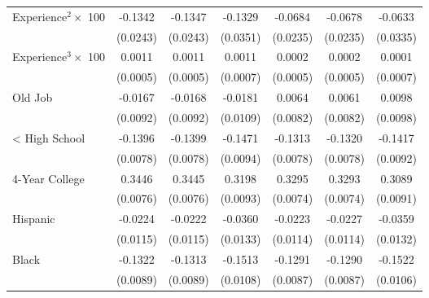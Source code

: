 {\begin{longtable}{l*{6}{c}}
Experience$^2\times$ 100&     -0.1342\sym{***}&     -0.1347\sym{***}&     -0.1329\sym{***}&     -0.0684\sym{***}&     -0.0678\sym{***}&     -0.0633\sym{*}  \\
                    &    (0.0243)         &    (0.0243)         &    (0.0351)         &    (0.0235)         &    (0.0235)         &    (0.0335)         \\
Experience$^3\times$ 100&      0.0011\sym{**} &      0.0011\sym{**} &      0.0011         &      0.0002         &      0.0002         &      0.0001         \\
                    &    (0.0005)         &    (0.0005)         &    (0.0007)         &    (0.0005)         &    (0.0005)         &    (0.0007)         \\
Old Job             &     -0.0167\sym{*}  &     -0.0168\sym{*}  &     -0.0181\sym{*}  &      0.0064         &      0.0061         &      0.0098         \\
                    &    (0.0092)         &    (0.0092)         &    (0.0109)         &    (0.0082)         &    (0.0082)         &    (0.0098)         \\
< High School       &     -0.1396\sym{***}&     -0.1399\sym{***}&     -0.1471\sym{***}&     -0.1313\sym{***}&     -0.1320\sym{***}&     -0.1417\sym{***}\\
                    &    (0.0078)         &    (0.0078)         &    (0.0094)         &    (0.0078)         &    (0.0078)         &    (0.0092)         \\
4-Year College      &      0.3446\sym{***}&      0.3445\sym{***}&      0.3198\sym{***}&      0.3295\sym{***}&      0.3293\sym{***}&      0.3089\sym{***}\\
                    &    (0.0076)         &    (0.0076)         &    (0.0093)         &    (0.0074)         &    (0.0074)         &    (0.0091)         \\
Hispanic            &     -0.0224\sym{*}  &     -0.0222\sym{*}  &     -0.0360\sym{***}&     -0.0223\sym{**} &     -0.0227\sym{**} &     -0.0359\sym{***}\\
                    &    (0.0115)         &    (0.0115)         &    (0.0133)         &    (0.0114)         &    (0.0114)         &    (0.0132)         \\
Black               &     -0.1322\sym{***}&     -0.1313\sym{***}&     -0.1513\sym{***}&     -0.1291\sym{***}&     -0.1290\sym{***}&     -0.1522\sym{***}\\
                    &    (0.0089)         &    (0.0089)         &    (0.0108)         &    (0.0087)         &    (0.0087)         &    (0.0106)         \\

\end{longtable}}
